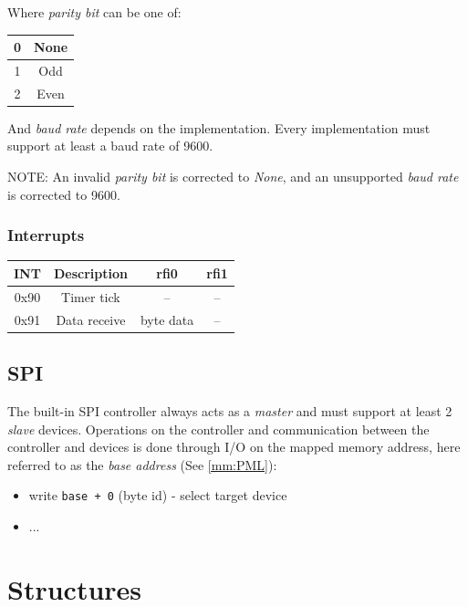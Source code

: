 \documentclass[a4paper,10pt]{article}
\begin{document}
Where \emph{parity bit} can be one of:
\begin{table}[H]
	\centering
	{
		\begin{tabular}{|c|c|}
\hline
0 & None \\
\hline
1 & Odd \\
\hline
2 & Even \\
\hline
		\end{tabular}
	}
\end{table}

And \emph{baud rate} depends on the implementation. Every implementation must support at least a baud rate of 9600.

NOTE: An invalid \emph{parity bit} is corrected to \emph{None}, and an unsupported \emph{baud rate} is corrected to 9600.

\subsubsection{Interrupts}
\begin{table}[H]
	\centering
	\begin{tabular}{|c|c|c|c|}
\hline
INT & Description & rfi0 & rfi1 \\
\hline
0x90 & Timer tick & -- & -- \\
\hline
0x91 & Data receive & byte data & -- \\
\hline
	\end{tabular}
\end{table}

\subsection{SPI} \label{hw:spi}
The built-in SPI controller always acts as a \emph{master} and must support at least 2 \emph{slave} devices. Operations on the controller and communication between the controller and devices is done through I/O on the mapped memory address, here referred to as the \emph{base address} (See \ref{mm:PML}):

\begin{itemize}
	\item write \verb|base + 0| (byte id) - select target device
	\item ...
\end{itemize}

\section{Structures}
\end{document}
